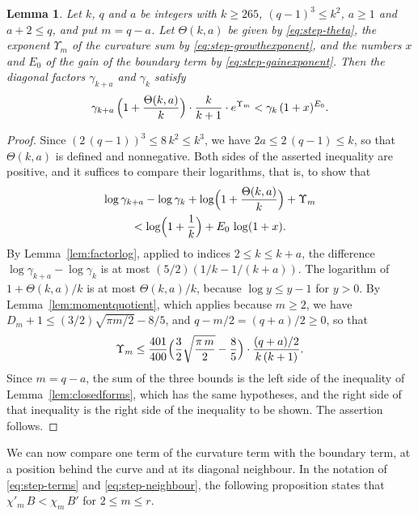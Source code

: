 \documentclass{amsart}
\makeatletter
\newtheorem{lemma}[theorem]{Lemma}
\theoremstyle{definition}
\theoremstyle{remark}
\numberwithin{equation}{section}
\def\subsection{\@startsection{subsection}{2}\z@{.5\linespacing\@plus.7\linespacing}{-.5em}{\normalfont\bfseries\boldmath}}
\makeatother
\begin{document}
\begin{lemma}\label{lem:scalar}
Let $k$, $q$ and $a$ be integers with $k\ge265$, $(q-1)^3\le k^2$, $a\ge1$
and $a+2\le q$, and put $m=q-a$. Let $\Theta(k,a)$ be given by
\eqref{eq:step-theta}, the exponent $\Upsilon_m$ of the curvature sum by
\eqref{eq:step-growthexponent}, and the numbers $x$ and $E_0$ of the gain of
the boundary term by \eqref{eq:step-gainexponent}. Then the
diagonal factors $\gamma_{k+a}$ and $\gamma_k$ satisfy
\[
\gamma_{k+a}\,\Bigl(1+\frac{\Theta(k,a)}{k}\Bigr)\cdot\frac{k}{k+1}\cdot
e^{\Upsilon_m}<\gamma_k\,(1+x)^{E_0}.
\]
\end{lemma}

\begin{proof}
Since $(2\,(q-1))^3\le8\,k^2\le k^3$, we have $2a\le2\,(q-1)\le k$, so that
$\Theta(k,a)$ is defined and nonnegative. Both sides of the asserted
inequality are positive, and it suffices to compare their logarithms, that
is, to show that
\begin{multline*}
\log\gamma_{k+a}-\log\gamma_k+\log\Bigl(1+\frac{\Theta(k,a)}{k}\Bigr)
+\Upsilon_m\\
<\log\Bigl(1+\frac1k\Bigr)+E_0\,\log(1+x).
\end{multline*}
By Lemma~\ref{lem:factorlog}, applied to indices $2\le k\le k+a$, the
difference $\log\gamma_{k+a}-\log\gamma_k$ is at most
$(5/2)(1/k-1/(k+a))$. The logarithm of $1+\Theta(k,a)/k$ is at most
$\Theta(k,a)/k$, because $\log y\le y-1$ for $y>0$. By
Lemma~\ref{lem:momentquotient}, which applies because $m\ge2$, we have
$D_m+1\le(3/2)\sqrt{\pi m/2}-8/5$, and $q-m/2=(q+a)/2\ge0$, so that
\[
\Upsilon_m\le\frac{401}{400}\Bigl(\frac32\sqrt{\frac{\pi\,m}{2}}-\frac85\Bigr)
\cdot
\frac{(q+a)/2}{k\,(k+1)}.
\]
Since $m=q-a$, the sum of the three bounds is the left side of the
inequality of Lemma~\ref{lem:closedforms}, which has the same hypotheses,
and the right side of that inequality is the right side of the inequality
to be shown. The assertion follows.
\end{proof}

\subsection{The cross inequality}\label{subsec:step-cross}

We can now compare one term of the curvature term with the boundary term, at
a position behind the curve and at its diagonal neighbour. In the notation
of \eqref{eq:step-terms} and \eqref{eq:step-neighbour}, the following
proposition states that $\chi'_m\,B<\chi_m\,B'$ for $2\le m\le r$.
\end{document}
